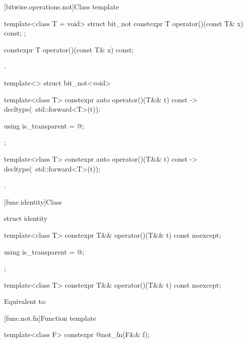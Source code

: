 [bitwise.operations.not]{Class template }

\begin{itemdecl}
template<class T = void> struct bit_not {
  constexpr T operator()(const T& x) const;
};
\end{itemdecl}

%
\begin{itemdecl}
constexpr T operator()(const T& x) const;
\end{itemdecl}

\begin{itemdescr}
\pnum
\returns
{}.
\end{itemdescr}

%
\begin{itemdecl}
template<> struct bit_not<void> {
  template<class T> constexpr auto operator()(T&& t) const
    -> decltype(~std::forward<T>(t));

  using is_transparent = @\unspec@;
};
\end{itemdecl}

%
\begin{itemdecl}
template<class T> constexpr auto operator()(T&& t) const
    -> decltype(~std::forward<T>(t));
\end{itemdecl}

\begin{itemdescr}
\pnum
\returns
{}.
\end{itemdescr}


[func.identity]{Class }

%
\begin{itemdecl}
struct identity {
  template<class T>
    constexpr T&& operator()(T&& t) const noexcept;

  using is_transparent = @\unspec@;
};

template<class T>
  constexpr T&& operator()(T&& t) const noexcept;
\end{itemdecl}

\begin{itemdescr}
\pnum
\effects
Equivalent to: 
\end{itemdescr}


[func.not.fn]{Function template }

%
\begin{itemdecl}
template<class F> constexpr @\unspec@ not_fn(F&& f);
\end{itemdecl}

